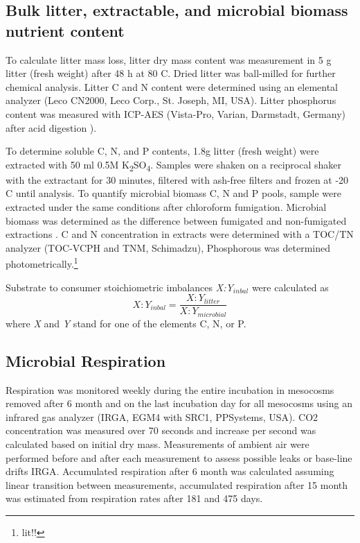 \documentclass[10pt]{article}
\begin{document}
\subsection*{Bulk litter, extractable, and microbial biomass nutrient content}
To calculate litter mass loss, litter dry mass content was measurement in 5 g litter (fresh weight) after 48 h at 80 \textdegree C. Dried litter was ball-milled for further chemical analysis. Litter C and N content were determined using an elemental analyzer (Leco CN2000, Leco Corp., St. Joseph, MI, USA). Litter phosphorus content was measured with ICP-AES (Vista-Pro, Varian, Darmstadt, Germany) after acid digestion \cite{Henschler1988}).

To determine soluble C, N, and P contents, 1.8g litter (fresh weight) were extracted with 50 ml 0.5M K\textsubscript{2}SO\textsubscript{4}. Samples were shaken on a reciprocal shaker with the extractant for 30 minutes, filtered with ash-free filters and frozen at -20 \textdegree C until analysis. To quantify microbial biomass C, N and P pools, sample were extracted under the same conditions after chloroform fumigation. Microbial biomass was determined as the difference between fumigated and non-fumigated extractions \cite{Schinner1996}. C and N concentration in extracts were determined with a TOC/TN analyzer (TOC-VCPH and TNM, Schimadzu), Phosphorous was determined photometrically.\footnote{lit!!}

Substrate to consumer stoichiometric imbalances \emph{X:Y$_{inbal}$} were calculated as
\begin{equation}
 X:Y_{inbal}=\frac{X:Y_{litter}}{X:Y_{microbial}} \label{eq:resp.acc}
\end{equation}
where \emph{X} and \emph{Y} stand for one of the elements C, N, or P.

\subsection*{Microbial Respiration}
Respiration was monitored weekly during the entire incubation in mesocosms removed after 6 month and on the last incubation day for all mesocosms using an infrared gas analyzer (IRGA, EGM4 with SRC1, PPSystems, USA). CO2 concentration was measured over 70 seconds and increase per second was calculated based on initial dry mass. Measurements of ambient air were performed before and after each measurement to assess possible leaks or base-line drifts IRGA. %
Accumulated respiration after 6 month was calculated assuming linear transition between measurements, accumulated respiration after 15 month was estimated from respiration rates after 181 and 475 days.
\end{document}
